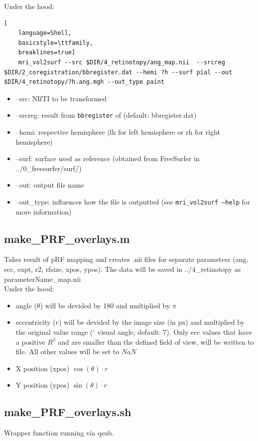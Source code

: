 \documentclass[12pt,a4paper]{scrartcl}
\begin{document}
\noindent Under the hood:
\begin{lstlisting}[
    language=Shell,
    basicstyle=\ttfamily,
    breaklines=true]
    mri_vol2surf --src $DIR/4_retinotopy/ang_map.nii  --srcreg $DIR/2_coregistration/bbregister.dat --hemi ?h --surf pial --out $DIR/4_retinotopy/?h.ang.mgh --out_type paint
\end{lstlisting}
\begin{itemize}
\item --src: NIfTI to be transformed
\item --srcreg: result from \texttt{bbregister} of \texttt{} (default: bbregister.dat)
\item --hemi: respective hemisphere (lh for left hemisphere or rh for right hemisphere)
\item --surf: surface used as reference (obtained from FreeSurfer in ../0\_freesurfer/surf/)
\item --out: output file name
\item --out\_type: influences how the file is outputted (see \texttt{mri\_vol2surf --help} for more information)
\end{itemize}

\subsection{make\_PRF\_overlays.m}
\label{m:mkprfO}
Takes result of pRF mapping and creates .nii files for separate parameters (ang, ecc, expt, r2, rfsize, xpos, ypos). The data will be saved in ../4\_retinotopy as parameterName\_map.nii\\

\noindent Under the hood:
\begin{itemize}
\item angle ($\theta$) will be devided by 180 and multiplied by $\pi$
\item eccentricity ($r$) will be devided by the image size (in px) and multiplied by the original value range ($^\circ$ visual angle; default: 7). Only ecc values that have a positive $R^2$ and are smaller than the defined field of view, will be written to file. All other values will be set to $NaN$
\item X position (xpos) $\cos(\theta)\cdotp r$
\item Y position (ypos) $\sin(\theta)\cdotp r$
\end{itemize}

\subsection{make\_PRF\_overlays.sh}
\label{sh:mkprfO}
Wrapper function running \texttt{} via qsub.\\
\end{document}
